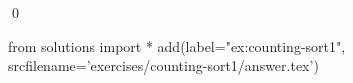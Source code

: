 
\begin{ex} 
  \label{ex:counting-sort1}
  
  \qed
\end{ex} 
\begin{python0}
from solutions import *
add(label="ex:counting-sort1",
    srcfilename='exercises/counting-sort1/answer.tex') 
\end{python0}
